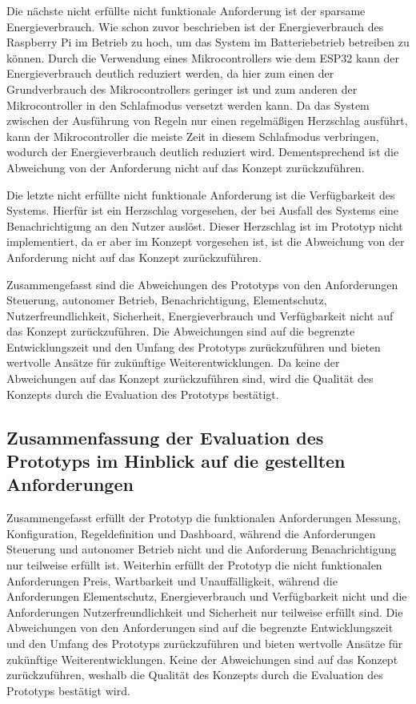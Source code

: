 Die nächste nicht erfüllte nicht funktionale Anforderung ist der sparsame Energieverbrauch.
Wie schon zuvor beschrieben ist der Energieverbrauch des Raspberry Pi im Betrieb zu hoch, um das System im Batteriebetrieb betreiben zu können.
Durch die Verwendung eines Mikrocontrollers wie dem ESP32 kann der Energieverbrauch deutlich reduziert werden, da hier zum einen der Grundverbrauch des Mikrocontrollers geringer ist und zum anderen der Mikrocontroller in den Schlafmodus versetzt werden kann.
Da das System zwischen der Ausführung von Regeln nur einen regelmäßigen Herzschlag ausführt, kann der Mikrocontroller die meiste Zeit in diesem Schlafmodus verbringen, wodurch der Energieverbrauch deutlich reduziert wird.
Dementsprechend ist die Abweichung von der Anforderung nicht auf das Konzept zurückzuführen.

Die letzte nicht erfüllte nicht funktionale Anforderung ist die Verfügbarkeit des Systems.
Hierfür ist ein Herzschlag vorgesehen, der bei Ausfall des Systems eine Benachrichtigung an den Nutzer auslöst.
Dieser Herzschlag ist im Prototyp nicht implementiert, da er aber im Konzept vorgesehen ist, ist die Abweichung von der Anforderung nicht auf das Konzept zurückzuführen.

Zusammengefasst sind die Abweichungen des Prototyps von den Anforderungen Steuerung, autonomer Betrieb, Benachrichtigung, Elementschutz, Nutzerfreundlichkeit, Sicherheit, Energieverbrauch und Verfügbarkeit nicht auf das Konzept zurückzuführen.
Die Abweichungen sind auf die begrenzte Entwicklungszeit und den Umfang des Prototyps zurückzuführen und bieten wertvolle Ansätze für zukünftige Weiterentwicklungen.
Da keine der Abweichungen auf das Konzept zurückzuführen sind, wird die Qualität des Konzepts durch die Evaluation des Prototyps bestätigt.

\subsection{Zusammenfassung der Evaluation des Prototyps im Hinblick auf die gestellten Anforderungen}
Zusammengefasst erfüllt der Prototyp die funktionalen Anforderungen Messung, Konfiguration, Regeldefinition und Dashboard, während die Anforderungen Steuerung und autonomer Betrieb nicht und die Anforderung Benachrichtigung nur teilweise erfüllt ist.
Weiterhin erfüllt der Prototyp die nicht funktionalen Anforderungen Preis, Wartbarkeit und Unauffälligkeit, während die Anforderungen Elementschutz, Energieverbrauch und Verfügbarkeit nicht und die Anforderungen Nutzerfreundlichkeit und Sicherheit nur teilweise erfüllt sind.
Die Abweichungen von den Anforderungen sind auf die begrenzte Entwicklungszeit und den Umfang des Prototyps zurückzuführen und bieten wertvolle Ansätze für zukünftige Weiterentwicklungen.
Keine der Abweichungen sind auf das Konzept zurückzuführen, weshalb die Qualität des Konzepts durch die Evaluation des Prototyps bestätigt wird.



